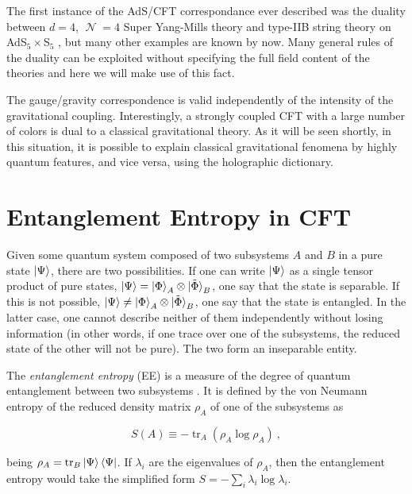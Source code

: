 \documentclass[twocolumn]{revtex4}
\providecommand{\eq}[2]{
    \begin{equation}
        #2
    \label{eq:#1}
    \end{equation}
}
\DeclareMathOperator{\calN}{\mathcal{N}}
\DeclareMathOperator{\tr}{tr}
\begin{document}
The first instance of the AdS/CFT correspondance ever described was the duality between $d=4$, $\calN=4$ Super Yang-Mills theory and type-IIB string theory on AdS$_5 \times $S$_5$ \cite{maldacena_large_1999}, but many other examples are known by now. Many general rules of the duality can be exploited without specifying the full field content of the theories and here we will make use of this fact.

The gauge/gravity correspondence is valid independently of the intensity of the gravitational coupling. Interestingly, a strongly coupled CFT with a large number of colors is dual to a classical gravitational theory. As it will be seen shortly, in this situation, it is possible to explain classical gravitational fenomena by highly quantum features, and vice versa, using the holographic dictionary.


\section{Entanglement Entropy in CFT} \label{s:EE_CFT}

Given some quantum system composed of two subsystems $A$ and $B$ in a pure state $\ket{\Psi}$, there are two possibilities. If one can write $\ket{\Psi}$ as a single tensor product of pure states, $\ket{\Psi} = \ket{\Phi}_A \otimes \ket{\tilde{\Phi}}_B$, one say that the state is separable. If this is not possible, $\ket{\Psi} \neq \ket{\Phi}_A \otimes \ket{\tilde{\Phi}}_B$, one say that the state is entangled.
In the latter case, one cannot describe neither of them independently without losing information (in other words, if one trace over one of the subsystems, the reduced state of the other will not be pure). The two form an inseparable entity.

The \textit{entanglement entropy} (EE) is a measure of the degree of quantum entanglement between two subsystems \cite{nishioka_entanglement_2018}. It is defined by the von Neumann entropy of the reduced density matrix $\rho_A$ of one of the subsystems as
\eq{EE}{
    S(A) \equiv - \tr_A ( \rho_A \log \rho_A ) \ ,
}
being $\rho_A = \tr_B \ket{\Psi}\bra{\Psi}$. If $\lambda_i$ are the eigenvalues of $\rho_A$, then the entanglement entropy would take the simplified form $S = - \sum_i \lambda_i \log \lambda_i$.
\end{document}
